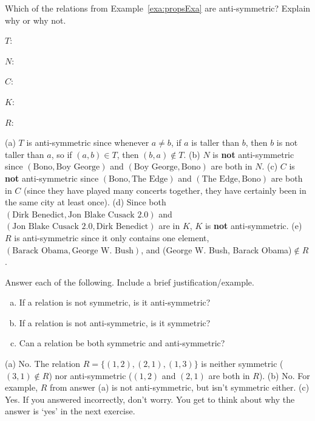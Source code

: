 \begin{exer}
Which of the relations from Example~\ref{exa:propsExa} are anti-symmetric?  Explain why or why not.
\begin{lenum}
\item $T$: \blanklinefill  

\blanklinefill
\item $N$: \blanklinefill 

\blanklinefill
\item $C$: \blanklinefill

\blanklinefill
\item $K$: \blanklinefill

\blanklinefill
\item $R$: \blanklinefill

\blanklinefill
\end{lenum}
\begin{answer}
(a) $T$ is anti-symmetric since whenever $a\neq b$, if $a$ is taller than $b$, then $b$ is not taller than $a$,
so if $(a,b)\in T$, then $(b,a)\not\in T$.  
(b) $N$ is {\bf not} anti-symmetric since $(\mbox{Bono},\mbox{Boy George})$ and $(\mbox{Boy George},\mbox{Bono})$ 
are both in $N$.
(c) $C$ is {\bf not} anti-symmetric since $(\mbox{Bono},\mbox{The Edge})$ and $(\mbox{The Edge},\mbox{Bono})$ 
are both in $C$ (since they have played many concerts together, they have certainly been in the same
city at least once).
(d) Since
both $(\mbox{Dirk Benedict},\mbox{Jon Blake Cusack 2.0})$ and
$(\mbox{Jon Blake Cusack 2.0},\mbox{Dirk Benedict})$ are in $K$,
$K$ is {\bf not} anti-symmetric.
(e) $R$ is anti-symmetric since it only contains one element, 
$(\mbox{Barack Obama}, \mbox{George W. Bush})$, and
(George W. Bush, Barack Obama)$\not\in R$.
\end{answer}
\end{exer}


\begin{ques}
Answer each of the following.  Include a brief justification/example.
\begin{enumerate}[(a)]
\item If a relation is not symmetric, is it anti-symmetric?

\noindent
\answerlinetwo
\item If a relation is not anti-symmetric, is it symmetric?

\noindent
\answerlinetwo
\item Can a relation be both symmetric and anti-symmetric?

\noindent
\answerlinetwo
\end{enumerate}
\begin{answer}
(a) No.  The relation $R=\{(1,2),(2,1),(1,3)\}$ is neither symmetric ($(3,1)\not\in R$)
nor anti-symmetric ($(1,2)$ and $(2,1)$ are both in $R$).
(b) No.  For example, $R$ from answer (a) is not anti-symmetric, but isn't symmetric either.
(c) Yes.  If you answered incorrectly, don't worry.  You get to think about why the answer
is `yes' in the next exercise.
\end{answer}
\end{ques}


